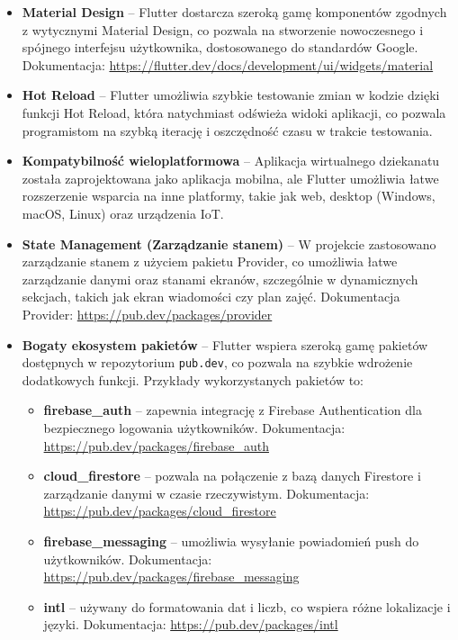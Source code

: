 \begin{itemize}
  \item \textbf{Material Design} – Flutter dostarcza szeroką gamę komponentów zgodnych z wytycznymi Material Design, co pozwala na stworzenie nowoczesnego i spójnego interfejsu użytkownika, dostosowanego do standardów Google. Dokumentacja: \url{https://flutter.dev/docs/development/ui/widgets/material}
  \item \textbf{Hot Reload} – Flutter umożliwia szybkie testowanie zmian w kodzie dzięki funkcji Hot Reload, która natychmiast odświeża widoki aplikacji, co pozwala programistom na szybką iterację i oszczędność czasu w trakcie testowania.
  \item \textbf{Kompatybilność wieloplatformowa} – Aplikacja wirtualnego dziekanatu została zaprojektowana jako aplikacja mobilna, ale Flutter umożliwia łatwe rozszerzenie wsparcia na inne platformy, takie jak web, desktop (Windows, macOS, Linux) oraz urządzenia IoT.
  \item \textbf{State Management (Zarządzanie stanem)} – W projekcie zastosowano zarządzanie stanem z użyciem pakietu Provider, co umożliwia łatwe zarządzanie danymi oraz stanami ekranów, szczególnie w dynamicznych sekcjach, takich jak ekran wiadomości czy plan zajęć. Dokumentacja Provider: \url{https://pub.dev/packages/provider}
  \item \textbf{Bogaty ekosystem pakietów} – Flutter wspiera szeroką gamę pakietów dostępnych w repozytorium \texttt{pub.dev}, co pozwala na szybkie wdrożenie dodatkowych funkcji. Przykłady wykorzystanych pakietów to:
        \begin{itemize}
          \item \textbf{firebase\_auth} – zapewnia integrację z Firebase Authentication dla bezpiecznego logowania użytkowników. Dokumentacja: \url{https://pub.dev/packages/firebase_auth}
          \item \textbf{cloud\_firestore} – pozwala na połączenie z bazą danych Firestore i zarządzanie danymi w czasie rzeczywistym. Dokumentacja: \url{https://pub.dev/packages/cloud_firestore}
          \item \textbf{firebase\_messaging} – umożliwia wysyłanie powiadomień push do użytkowników. Dokumentacja: \url{https://pub.dev/packages/firebase_messaging}
          \item \textbf{intl} – używany do formatowania dat i liczb, co wspiera różne lokalizacje i języki. Dokumentacja: \url{https://pub.dev/packages/intl}
        \end{itemize}

\end{itemize}
